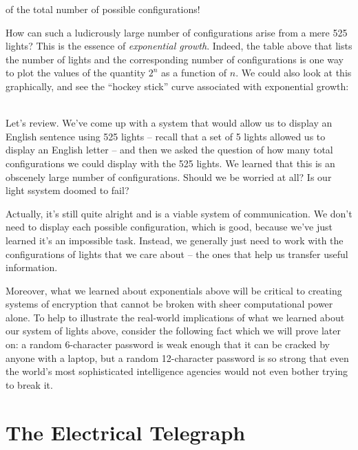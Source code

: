 \documentclass{book}
\begin{document}
of the total number of possible configurations!

How can such a ludicrously large number of configurations arise from a mere 525 lights? This is the essence of \emph{exponential growth}. Indeed, the table above that lists the number of lights and the corresponding number of configurations is one way to plot the values of the quantity $2^n$ as a function of $n$. We could also look at this graphically, and see the ``hockey stick'' curve associated with exponential growth: \\

 \\

Let's review. We've come up with a system that would allow us to display an English sentence using 525 lights -- recall that a set of 5 lights allowed us to display an English letter -- and then we asked the question of how many total configurations we could display with the 525 lights. We learned that this is an obscenely large number of configurations. Should we be worried at all? Is our light ssystem doomed to fail?

Actually, it's still quite alright and is a viable system of communication. We don't need to display each possible configuration, which is good, because we've just learned it's an impossible task. Instead, we generally just need to work with the configurations of lights that we care about -- the ones that help us transfer useful information.

Moreover, what we learned about exponentials above will be critical to creating systems of encryption that cannot be broken with sheer computational power alone. To help to illustrate the real-world implications of what we learned about our system of lights above, consider the following fact which we will prove later on: a random 6-character password is weak enough that it can be cracked by anyone with a laptop, but a random 12-character password is so strong that even the world's most sophisticated intelligence agencies would not even bother trying to break it.

\chapter{The Electrical Telegraph}
\end{document}
